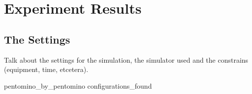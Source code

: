 

\section{Experiment Results}
\subsection{The Settings}
Talk about the settings for the simulation, the simulator used and the
constrains (equipment, time, etcetera).

{pentomino_by_pentomino}
{configurations_found}

